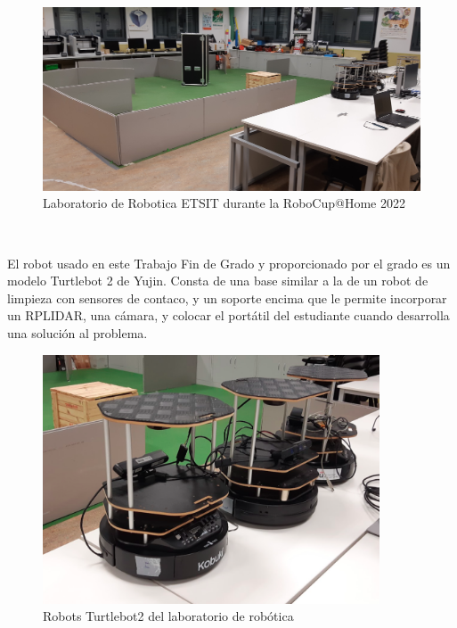 \begin{figure}[H]
  \begin{center}
    \includegraphics[width=12cm]{imagenes/cap1/laboratorio-robotica.png}
  \end{center}
  \caption[Laboratorio de Robotica ETSIT durante la RoboCup@Home 2022]{Laboratorio de Robotica ETSIT durante la RoboCup@Home 2022}
  \label{fig:laboratorio_robocup}
\end{figure}\

El robot usado en este Trabajo Fin de Grado y proporcionado por el grado es un modelo Turtlebot 2 de Yujin. Consta de una base  similar a la de un robot de limpieza con sensores de contaco, y un soporte encima que le permite incorporar un RPLIDAR, una cámara, y colocar el portátil del estudiante cuando desarrolla una solución al problema.

\begin{figure}[H]
  \begin{center}
    \includegraphics[width=10cm]{imagenes/cap1/robots-turtlebot2-laboratorio.png}
  \end{center}
  \caption[Robots Turtlebot2 del laboratorio de robótica]{Robots Turtlebot2 del laboratorio de robótica}
  \label{fig:robots_laboratorio_robotica}
\end{figure}\

